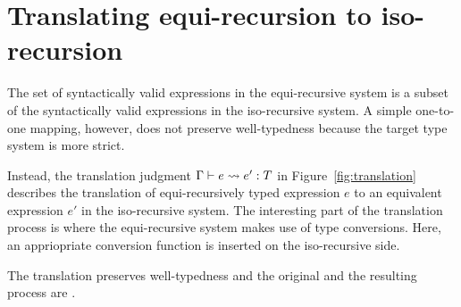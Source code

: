 \section{Translating equi-recursion to iso-recursion}

The set of syntactically valid expressions in the equi-recursive system is a
subset of the syntactically valid expressions in the iso-recursive system. A
simple one-to-one mapping, however, does not preserve well-typedness because
the target type system is more strict.



Instead, the translation judgment $\translation e {e'} T$ in
Figure~\ref{fig:translation} describes the translation of equi-recursively
typed expression $e$ to an equivalent expression $e'$ in the iso-recursive
system. The interesting part of the translation process is where the
equi-recursive system makes use of type conversions. Here, an appriopriate
conversion function is inserted on the iso-recursive side.

The translation preserves well-typedness and the original and the
resulting process are .  

